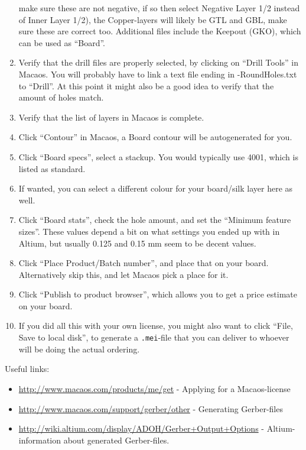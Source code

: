 \begin{enumerate}
  make sure these are not negative, if so then select Negative Layer 1/2 instead
  of Inner Layer 1/2), the Copper-layers will likely be GTL and GBL, make sure
  these are correct too. Additional files include the Keepout (GKO), which can
  be used as ``Board''.
\item Verify that the drill files are properly selected, by clicking on ``Drill
  Tools'' in Macaos. You will probably have to link a text file ending in
  -RoundHoles.txt to ``Drill''. At this point it might also be a good idea to
  verify that the amount of holes match.
\item Verify that the list of layers in Macaos is complete.
\item Click ``Contour'' in Macaos, a Board contour will be autogenerated for
  you.
\item Click ``Board specs'', select a stackup. You would typically use 4001,
  which is listed as standard.
\item If wanted, you can select a different colour for your board/silk layer
  here as well.
\item Click ``Board stats'', check the hole amount, and set the ``Minimum
  feature sizes''. These values depend a bit on what settings you ended up with
  in Altium, but usually 0.125 and 0.15 mm seem to be decent values.
\item Click ``Place Product/Batch number'', and place that on your board.
  Alternatively skip this, and let Macaos pick a place for it.
\item Click ``Publish to product browser'', which allows you to get a price
  estimate on your board.
\item If you did all this with your own license, you might also want to click
  ``File, Save to local disk'', to generate a {\tt .mei}-file that you can
  deliver to whoever will be doing the actual ordering.
\end{enumerate}

Useful links:
\begin{itemize}
\item \url{http://www.macaos.com/products/me/get} - Applying for a
  Macaos-license
\item \url{http://www.macaos.com/support/gerber/other} - Generating Gerber-files
\item \url{http://wiki.altium.com/display/ADOH/Gerber+Output+Options} -
  Altium-information about generated Gerber-files.
\end{itemize}
